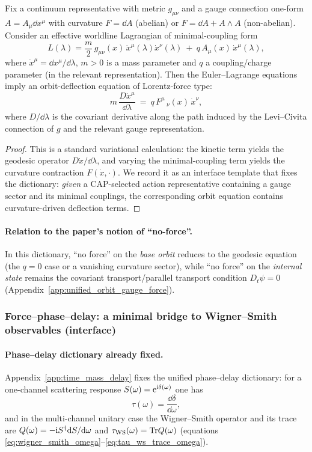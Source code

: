 \begin{proposition}
\label{prop:lorentz_force_from_minimal_coupling_interface}
\InterfaceTag Fix a continuum representative with metric $g_{\mu\nu}$ and a gauge connection one-form $A=A_\mu \dd x^\mu$ with curvature $F=\dd A$ (abelian) or $F=\dd A + A\wedge A$ (non-abelian).
Consider an effective worldline Lagrangian of minimal-coupling form
\[
L(\lambda)=\frac{m}{2}\,g_{\mu\nu}(x)\,\dot x^\mu(\lambda)\dot x^\nu(\lambda)\ +\ q\,A_\mu(x)\,\dot x^\mu(\lambda),
\]
where $\dot x^\mu=\dd x^\mu/\dd\lambda$, $m>0$ is a mass parameter and $q$ a coupling/charge parameter (in the relevant representation).
Then the Euler--Lagrange equations imply an orbit-deflection equation of Lorentz-force type:
\[
m\,\frac{D\dot x^\mu}{\dd\lambda}
\ =\
q\,{F^\mu}_{\ \nu}(x)\,\dot x^\nu,
\]
where $D/\dd\lambda$ is the covariant derivative along the path induced by the Levi--Civita connection of $g$ and the relevant gauge representation.
\end{proposition}

\begin{proof}
This is a standard variational calculation: the kinetic term yields the geodesic operator $D\dot x/\dd\lambda$, and varying the minimal-coupling term yields the curvature contraction $F(\dot x,\cdot)$.
We record it as an interface template that fixes the dictionary: \emph{given} a CAP-selected action representative containing a gauge sector and its minimal couplings, the corresponding orbit equation contains curvature-driven deflection terms.
\end{proof}

\paragraph{Relation to the paper's notion of ``no-force''.}
\InterfaceTag In this dictionary, ``no force'' on the \emph{base orbit} reduces to the geodesic equation (the $q=0$ case or a vanishing curvature sector), while ``no force'' on the \emph{internal state} remains the covariant transport/parallel transport condition $D_t\psi=0$ (Appendix~\ref{app:unified_orbit_gauge_force}).

\subsubsection{Force--phase--delay: a minimal bridge to Wigner--Smith observables (interface)}
\paragraph{Phase--delay dictionary already fixed.}
\InterfaceTag Appendix~\ref{app:time_mass_delay} fixes the unified phase--delay dictionary:
for a one-channel scattering response $S(\omega)=\mathrm{e}^{\mathrm{i}\delta(\omega)}$ one has
\[
\tau(\omega)=\frac{\dd\delta}{\dd\omega},
\]
and in the multi-channel unitary case the Wigner--Smith operator and its trace are
$Q(\omega)=-\mathrm{i} S^\dagger \mathrm{d} S/\mathrm{d}\omega$ and $\tau_{\mathrm{WS}}(\omega)=\mathrm{Tr} Q(\omega)$ (equations \eqref{eq:wigner_smith_omega}--\eqref{eq:tau_ws_trace_omega}).

